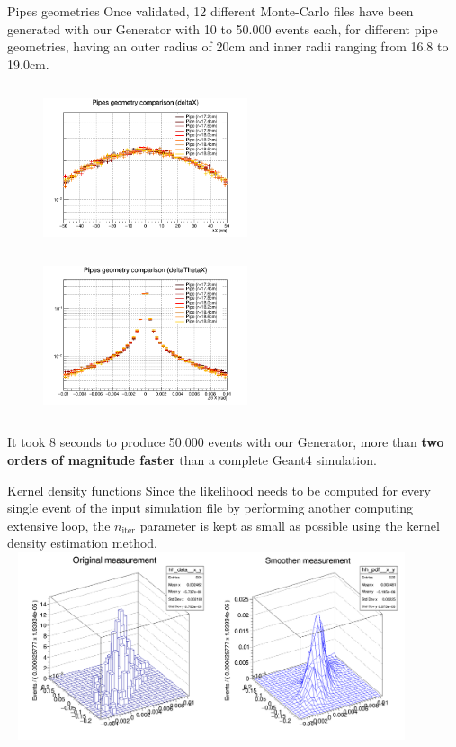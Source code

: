 \documentclass[8 pt]{beamer}
\begin{document}
\begin{frame}{Pipes geometries}
\justifying
Once validated, 12 different Monte-Carlo files have been generated with our Generator with 10 to 50.000 events each, for different pipe geometries, having an outer radius of 20cm and inner radii ranging from 16.8 to 19.0cm. \vfill

\begin{figure}[htbp]
\centering
\begin{minipage}[b]{.49\textwidth}
\includegraphics[width=6cm, height=4.8cm]{figs/deltaX.png}
\end{minipage}\hfill
\begin{minipage}[b]{.49\textwidth}
\includegraphics[width=6cm, height=4.8cm]{figs/deltaThetaX.png}
\end{minipage}\hfill
\label{fig:gemComp}
\end{figure} \vfill

It took 8 seconds to produce 50.000 events with our Generator, more than \textbf{two orders of magnitude faster} than a complete Geant4 simulation. \vfill
\end{frame}

\begin{frame}{Kernel density functions}
\justifying
Since the likelihood needs to be computed for every single event of the input simulation file by performing another computing extensive loop, the $n_{\text{iter}}$ parameter is kept as small as possible using the kernel density estimation method. \vfill
\includegraphics[width=12cm, height=5.5cm]{figs/plot_kernelx.png} \vfill
\end{frame}
\end{document}
